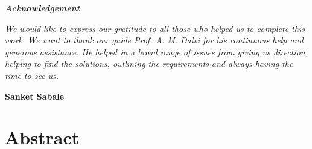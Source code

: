 \documentclass[12pt,a4paper]{report}
\begin{document}
\begin{center}
\newpage

\pagebreak
\hspace{0pt}
\vfill
{\LARGE \textbf{\textit{Acknowledgement}}}

\begin{FlushLeft}
{\large \textit{
\quad We would like to express our gratitude to all those who helped us to complete
this work. We want to thank our guide Prof. A. M. Dalvi for his continuous help and 
generous assistance. He helped in a broad range of issues from giving us
direction, helping to find the solutions, outlining the requirements and always
having the time to see us.
}}
\\

\end{FlushLeft}


\begin{FlushRight}

{\large \textbf{Sanket Sabale}}

\end{FlushRight}



\vfill
\hspace{0pt}
\pagebreak
\end{center}


\newpage 
{}


\setlength{\headheight}{20pt}
 
\pagestyle{fancyplain}
\renewcommand{\chaptermark}[1]{\markboth{#1}{}}
 
\lhead{\fancyplain{}}
\chead{}
\rhead{\fancyplain{}{\textit{\leftmark}}}
\lfoot{}
\cfoot{\thepage}
\rfoot{}



\tableofcontents
\newpage

\chapter*{\centering Abstract}
\end{document}
